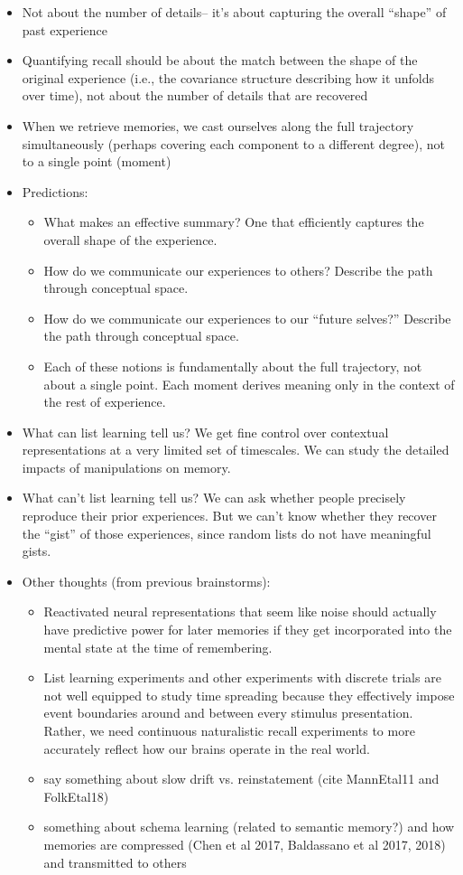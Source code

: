 \begin{itemize}
\item Not about the number of details-- it's about capturing the overall ``shape'' of past experience
\item Quantifying recall should be about the match between the shape of the original experience (i.e., the covariance structure describing how it unfolds over time), not about the number of details that are recovered
\item When we retrieve memories, we cast ourselves along the full trajectory simultaneously (perhaps covering each component to a different degree), not to a single point (moment)
\item Predictions:
\begin{itemize}
    \item What makes an effective summary?  One that efficiently captures the overall shape of the experience.
    \item How do we communicate our experiences to others?  Describe the path through conceptual space.
    \item How do we communicate our experiences to our ``future selves?''  Describe the path through conceptual space.
    \item Each of these notions is fundamentally about the full trajectory, not about a single point.  Each moment derives meaning only in the context of the rest of experience.
\end{itemize}
\item What can list learning tell us?  We get fine control over  contextual representations at a very limited set of timescales.  We can study the detailed impacts of manipulations on memory.
\item What can't list learning tell us?  We can ask whether people precisely reproduce their prior experiences.  But we can't know whether they recover the ``gist'' of those experiences, since random lists do not have meaningful gists.
\item Other thoughts (from previous brainstorms):
    \begin{itemize}
    \item Reactivated neural representations that seem like noise should actually have predictive power for later memories if they get incorporated into the mental state at the time of remembering.
    \item List learning experiments and other experiments with discrete trials are not well equipped to study time spreading because they effectively impose event boundaries around and between every stimulus presentation.  Rather, we need continuous naturalistic recall experiments to more accurately reflect how our brains operate in the real world.
    \item say something about slow drift vs. reinstatement (cite MannEtal11 and FolkEtal18)
    \item something about schema learning (related to semantic memory?) and how memories are compressed (Chen et al 2017, Baldassano et al 2017, 2018) and transmitted to others
    \end{itemize}
  \end{itemize}


